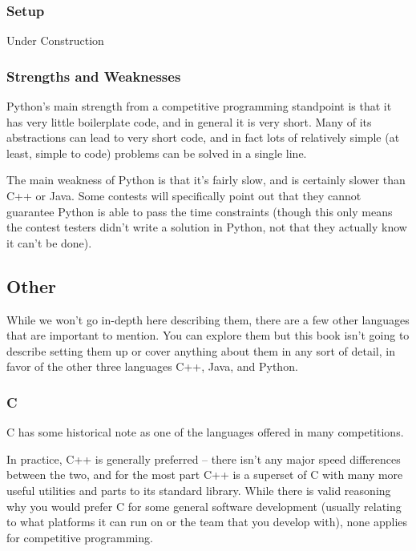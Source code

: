 \subsubsection{Setup}

Under Construction

\subsubsection{Strengths and Weaknesses}

Python's main strength from a competitive programming standpoint is that it has very little boilerplate code, and in general it is very short. Many of its abstractions can lead to very short code, and in fact lots of relatively simple (at least, simple to code) problems can be solved in a single line.

The main weakness of Python is that it's fairly slow, and is certainly slower than C++ or Java. Some contests will specifically point out that they cannot guarantee Python is able to pass the time constraints (though this only means the contest testers didn't write a solution in Python, not that they actually know it can't be done).

\subsection{Other}

While we won't go in-depth here describing them, there are a few other languages that are important to mention. You can explore them but this book isn't going to describe setting them up or cover anything about them in any sort of detail, in favor of the other three languages C++, Java, and Python.

\subsubsection{C}

C has some historical note as one of the languages offered in many competitions.

In practice, C++ is generally preferred -- there isn't any major speed differences between the two, and for the most part C++ is a superset of C with many more useful utilities and parts to its standard library. While there is valid reasoning why you would prefer C for some general software development (usually relating to what platforms it can run on or the team that you develop with), none applies for competitive programming.


